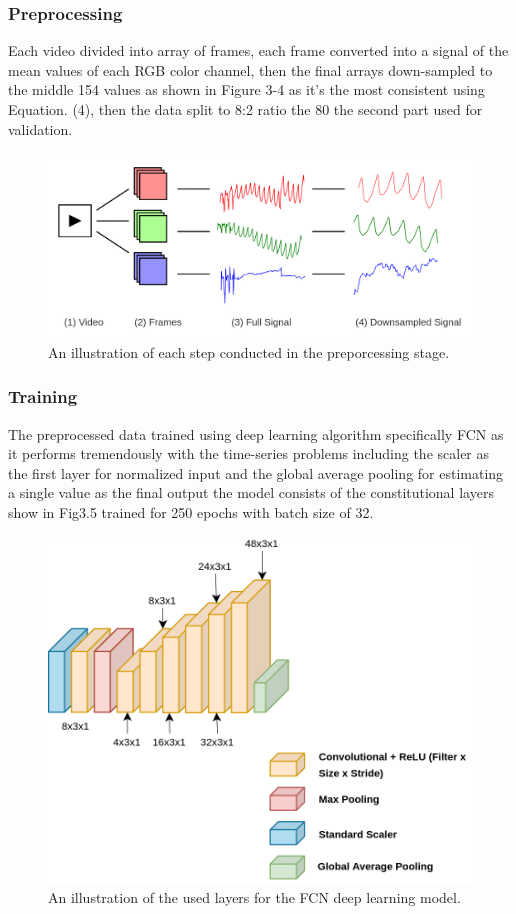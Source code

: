 \documentclass{bmcart}
\begin{document}
\subsubsection*{Preprocessing}
Each video divided into array of frames, each frame converted into a signal of
the mean values of each RGB color channel, then the final arrays down-sampled to
the middle 154 values as shown in Figure 3-4 as it’s the most consistent using
Equation. (4), then the data split to 8:2 ratio the 80%
the second part used for validation.
\begin{figure}[h!]
  \includegraphics[width=.9\linewidth]{png_images/preporcessing.png}
  \caption{
      An illustration of each step conducted in the preporcessing stage.}
\end{figure}
\FloatBarrier

\subsubsection*{Training}
The preprocessed data trained using deep learning algorithm specifically FCN as
it performs tremendously with the time-series problems including the scaler as
the first layer for normalized input and the global average pooling for
estimating a single value as the final output the model consists of the
constitutional layers show in Fig3.5 trained for 250 epochs with batch size of
32.
\begin{figure}[h!]
  \includegraphics[width=.9\linewidth]{png_images/spo2_model.png}
  \caption{
  An illustration of the used layers for the FCN deep learning model.}
\end{figure}
\FloatBarrier
\end{document}
